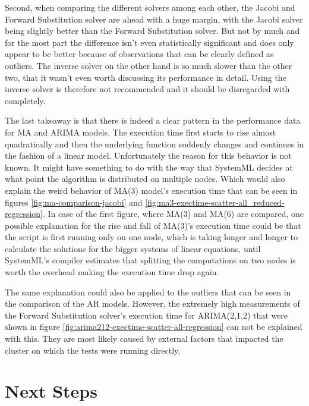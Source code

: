 Second, when comparing the different solvers among each other, the Jacobi and Forward Substitution solver are ahead with a huge margin, with the Jacobi solver being slightly better than the Forward Substitution solver. But not by much and for the most part the difference isn't even statistically significant and does only appear to be better because of observations that can be clearly defined as outliers. The inverse solver on the other hand is so much slower than the other two, that it wasn't even worth discussing its performance in detail. Using the inverse solver is therefore not recommended and it should be disregarded with completely.

The last takeaway is that there is indeed a clear pattern in the performance data for \acs{MA} and \acs{ARIMA} models. The execution time first starts to rise almost quadratically and then the underlying function suddenly changes and continues in the fashion of a linear model. Unfortunately the reason for this behavior is not known. It might have something to do with the way that SystemML decides at what point the algorithm is distributed on multiple nodes. Which would also explain the weird behavior of \acs{MA}(3) model's execution time that can be seen in figures \ref{fig:ma-comparison-jacobi} and \ref{fig:ma3-exectime-scatter-all_reduced-regression}. In case of the first figure, where \acs{MA}(3) and \acs{MA}(6) are compared, one possible explanation for the rise and fall of \acs{MA}(3)'s execution time could be that the script is first running only on one node, which is taking longer and longer to calculate the solutions for the bigger systems of linear equations, until SystemML's compiler estimates that splitting the computations on two nodes is worth the overhead making the execution time drop again. 

The same explanation could also be applied to the outliers that can be seen in the comparison of the \acl{AR} models. However, the extremely high measurements of the Forward Substitution solver's execution time for \acs{ARIMA}(2,1,2) that were shown in figure \ref{fig:arima212-exectime-scatter-all-regression} can not be explained with this. They are most likely caused by external factors that impacted the cluster on which the tests were running directly.


\section{Next Steps}\label{conclude_whatsnext}

